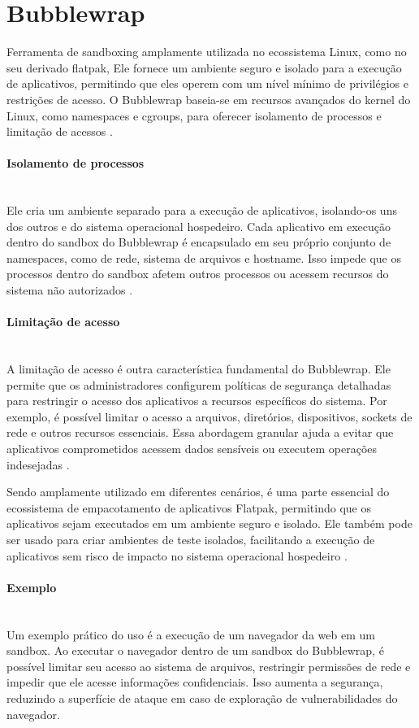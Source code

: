\section{Bubblewrap}

 Ferramenta de sandboxing amplamente utilizada no ecossistema Linux, como no seu derivado flatpak, Ele fornece um ambiente seguro e isolado para a execução de aplicativos, permitindo que eles operem com um nível mínimo de privilégios e restrições de acesso. O Bubblewrap baseia-se em recursos avançados do kernel do Linux, como namespaces e cgroups, para oferecer isolamento de processos e limitação de acessos \cite{bubblewrap-github, bubblewrap-archlinux}.

\paragraph*{Isolamento de processos}\mbox{}\\
Ele cria um ambiente separado para a execução de aplicativos, isolando-os uns dos outros e do sistema operacional hospedeiro. Cada aplicativo em execução dentro do sandbox do Bubblewrap é encapsulado em seu próprio conjunto de namespaces, como de rede, sistema de arquivos e hostname. Isso impede que os processos dentro do sandbox afetem outros processos ou acessem recursos do sistema não autorizados \cite{linux-containers-virtualization}.

\paragraph*{Limitação de acesso}\mbox{}\\
A limitação de acesso é outra característica fundamental do Bubblewrap. Ele permite que os administradores configurem políticas de segurança detalhadas para restringir o acesso dos aplicativos a recursos específicos do sistema. Por exemplo, é possível limitar o acesso a arquivos, diretórios, dispositivos, sockets de rede e outros recursos essenciais. Essa abordagem granular ajuda a evitar que aplicativos comprometidos acessem dados sensíveis ou executem operações indesejadas \cite{linux-security-redhat, bubblewrap-archlinux}.

 Sendo amplamente utilizado em diferentes cenários, é uma parte essencial do ecossistema de empacotamento de aplicativos Flatpak, permitindo que os aplicativos sejam executados em um ambiente seguro e isolado. Ele também pode ser usado para criar ambientes de teste isolados, facilitando a execução de aplicativos sem risco de impacto no sistema operacional hospedeiro 
 \cite{bubblewrap-github, bubblewrap-archlinux}.

\paragraph*{Exemplo}\mbox{}\\
Um exemplo prático do uso é a execução de um navegador da web em um sandbox. Ao executar o navegador dentro de um sandbox do Bubblewrap, é possível limitar seu acesso ao sistema de arquivos, restringir permissões de rede e impedir que ele acesse informações confidenciais. Isso aumenta a segurança, reduzindo a superfície de ataque em caso de exploração de vulnerabilidades do navegador.